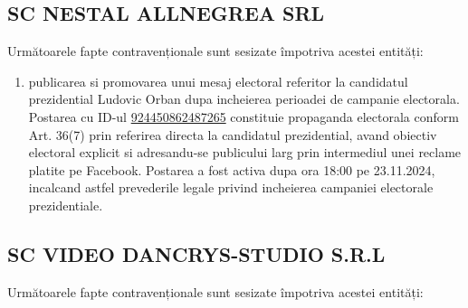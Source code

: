 \documentclass[a4paper,12pt]{article}
\begin{document}
\vspace{0.5cm}

\subsection{SC NESTAL ALLNEGREA SRL}
Următoarele fapte contravenționale sunt sesizate împotriva acestei entități:

\begin{enumerate}[leftmargin=*, label=\arabic*.)]
    \item publicarea si promovarea unui mesaj electoral referitor la candidatul prezidential Ludovic Orban dupa incheierea perioadei de campanie electorala. Postarea cu ID-ul \href{https://www.facebook.com/ads/library/?id=924450862487265}{924450862487265} constituie propaganda electorala conform Art. 36(7) prin referirea directa la candidatul prezidential, avand obiectiv electoral explicit si adresandu-se publicului larg prin intermediul unei reclame platite pe Facebook. Postarea a fost activa dupa ora 18:00 pe 23.11.2024, incalcand astfel prevederile legale privind incheierea campaniei electorale prezidentiale.
\end{enumerate}

\vspace{0.5cm}

\subsection{SC VIDEO DANCRYS-STUDIO S.R.L}
Următoarele fapte contravenționale sunt sesizate împotriva acestei entități:
\end{document}
